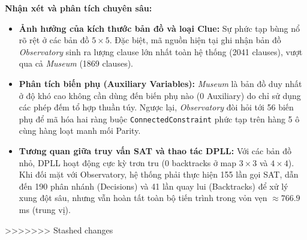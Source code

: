 \textbf{Nhận xét và phân tích chuyên sâu:}
\begin{itemize}
    \item \textbf{Ảnh hưởng của kích thước bản đồ và loại Clue:} Sự phức tạp bùng nổ rõ rệt ở các bản đồ $5\times5$. Đặc biệt, mã nguồn hiện tại ghi nhận bản đồ \textit{Observatory} sinh ra lượng clause lớn nhất toàn hệ thống (2041 clauses), vượt qua cả \textit{Museum} (1869 clauses). 
    
    \item \textbf{Phân tích biến phụ (Auxiliary Variables):} \textit{Museum} là bản đồ duy nhất ở độ khó cao không cần dùng đến biến phụ nào (0 Auxiliary) do chỉ sử dụng các phép đếm tổ hợp thuần túy. Ngược lại, \textit{Observatory} đòi hỏi tới 56 biến phụ để mã hóa hai ràng buộc \texttt{ConnectedConstraint} phức tạp trên hàng 5 ô cùng hàng loạt manh mối Parity.
    
    \item \textbf{Tương quan giữa truy vấn SAT và thao tác DPLL:} Với các bản đồ nhỏ, DPLL hoạt động cực kỳ trơn tru (0 backtracks ở map $3\times3$ và $4\times4$). Khi đối mặt với Observatory, hệ thống phải thực hiện 155 lần gọi SAT, dẫn đến 190 phân nhánh (Decisions) và 41 lần quay lui (Backtracks) để xử lý xung đột sâu, nhưng vẫn hoàn tất toàn bộ tiến trình trong vỏn vẹn $\approx 766.9$ ms (trung vị).
\end{itemize}
>>>>>>> Stashed changes
